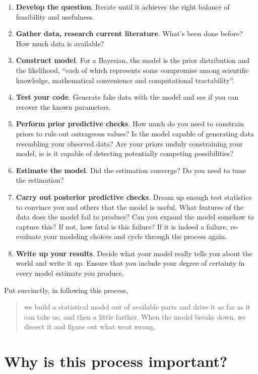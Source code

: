 \documentclass[]{article}
\begin{document}
\begin{enumerate}
\item
  \textbf{Develop the question}. Iterate until it achieves the right
  balance of feasibility and usefulness.
\item
  \textbf{Gather data, research current literature}. What's been done
  before? How much data is available?
\item
  \textbf{Construct model}. For a Bayesian, the model is the prior
  distribution and the likelihood, ``each of which represents some
  compromise among scientific knowledge, mathematical convenience and
  computational tractability''.
\item
  \textbf{Test your code}. Generate fake data with the model and see if
  you can recover the known parameters.
\item
  \textbf{Perform prior predictive checks}. How much do you need to
  constrain priors to rule out outrageous values? Is the model capable
  of generating data resembling your observed data? Are your priors
  unduly constraining your model, ie is it capable of detecting
  potentially competing possibilities?
\item
  \textbf{Estimate the model}. Did the estimation converge? Do you need
  to tune the estimation?
\item
  \textbf{Carry out posterior predictive checks}. Dream up enough test
  statistics to convince you and others that the model is useful. What
  features of the data does the model fail to produce? Can you expand
  the model somehow to capture this? If not, how fatal is this failure?
  If it is indeed a failure, re-evaluate your modeling choices and cycle
  through the process again.
\item
  \textbf{Write up your results}. Decide what your model really tells
  you about the world and write it up. Ensure that you include your
  degree of certainty in every model estimate you produce.
\end{enumerate}

Put succinctly, in following this process, 
\begin{quote} 
we build a statistical model out of available parts and drive it as far as it can take us, and then a little farther. When the model breaks down, we dissect it and figure out what went wrong.
\end{quote}

\newpage

\section{Why is this process important?}
\end{document}
